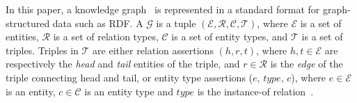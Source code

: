 In this paper, a knowledge graph~\cite{Pan2016} is represented in a standard format for graph-structured data such as RDF. A    $\mathcal{G}$  is a tuple $(\mathcal{E},\mathcal{R}, \mathcal{C},\mathcal{T} )$, where  $\mathcal{E}$ is a set of entities,  $\mathcal{R}$ is a set of relation types, $\mathcal{C}$ is a set of entity types,  and  $\mathcal{T}$ is a set of triples.
Triples in $\mathcal{T}$ are 
either relation assertions $(h,r,t)$,
where $h,t \in \mathcal{E}$  are respectively the \emph{head} and \emph{tail} entities of the triple, and $r \in \mathcal{R}$ is the \emph{edge}  of the triple connecting  head and tail, or entity type assertions ($e$, $type$, $c$), where $e \in \mathcal{E}$ is an entity, $c\in \mathcal{C}$ is an entity type  and $type$ is  the instance-of relation~\cite{DBLP:series/ihis/Pan09}. %

